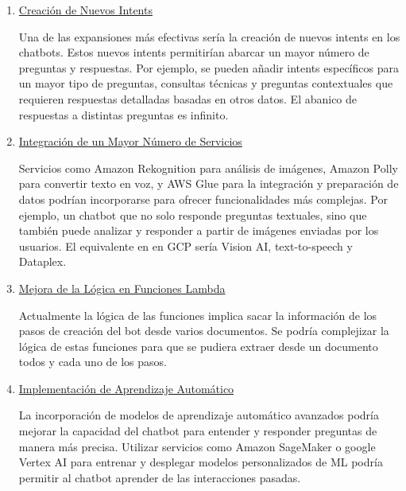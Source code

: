 \begin{enumerate}
    \item \underline{Creación de Nuevos Intents}

    Una de las expansiones más efectivas sería la creación de nuevos intents en los chatbots. Estos nuevos intents permitirían abarcar un mayor número de preguntas y respuestas. Por ejemplo, se pueden añadir intents específicos para un mayor tipo de preguntas, consultas técnicas y preguntas contextuales que requieren respuestas detalladas basadas en otros datos. El abanico de respuestas a distintas preguntas es infinito.

    \item \underline{Integración de un Mayor Número de Servicios}

    Servicios como Amazon Rekognition para análisis de imágenes, Amazon Polly para convertir texto en voz, y AWS Glue para la integración y preparación de datos podrían incorporarse para ofrecer funcionalidades más complejas. Por ejemplo, un chatbot que no solo responde preguntas textuales, sino que también puede analizar y responder a partir de imágenes enviadas por los usuarios. El equivalente en en GCP sería Vision AI, text-to-speech y Dataplex.

    \item \underline{Mejora de la Lógica en Funciones Lambda}

    Actualmente la lógica de las funciones implica sacar la información de los pasos de creación del bot desde varios documentos. Se podría complejizar la lógica de estas funciones para que se pudiera extraer desde un documento todos y cada uno de los pasos. 

    \item \underline{Implementación de Aprendizaje Automático}

    La incorporación de modelos de aprendizaje automático avanzados podría mejorar la capacidad del chatbot para entender y responder preguntas de manera más precisa. Utilizar servicios como Amazon SageMaker o google Vertex AI para entrenar y desplegar modelos personalizados de ML podría permitir al chatbot aprender de las interacciones pasadas.
  
    
\end{enumerate}
